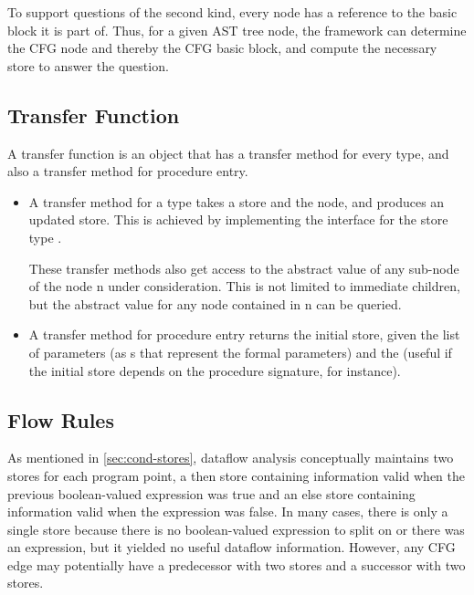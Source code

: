 To support questions of the second kind, every node has a reference to
the basic block it is part of. Thus, for a given AST tree node, the
framework can determine the CFG node and thereby the CFG basic block,
and compute the necessary store to answer the question.


\subsection{Transfer Function}
\label{sec:transfer-fnc}

A transfer function is an object that has a transfer method for
every  type, and also a transfer method for procedure entry.

\begin{itemize}
\item A transfer method for a  type takes a store
  and the node, and produces an updated store. This is achieved by
  implementing the  interface for the store
  type .

  These transfer methods also get access to the abstract value of any
  sub-node of the node \code n under consideration.  This is not limited
  to immediate children, but the abstract value for any node contained
  in \code n can be queried.

\item A transfer method for procedure entry returns the initial store, given the
  list of parameters (as s that represent the formal
  parameters) and the
   (useful if the initial store depends on the procedure
  signature, for instance).

\end{itemize}


\subsection{Flow Rules}
\label{sec:flow-rules}

As mentioned in \autoref{sec:cond-stores}, dataflow analysis
conceptually maintains two stores for each program point, a then store
containing information valid when the previous boolean-valued
expression was true and an else store containing information valid
when the expression was false.  In many cases, there is only a single
store because there is no boolean-valued expression to split on or
there was an expression, but it yielded no useful dataflow
information.  However, any CFG edge may potentially have a predecessor
with two stores and a successor with two stores.


